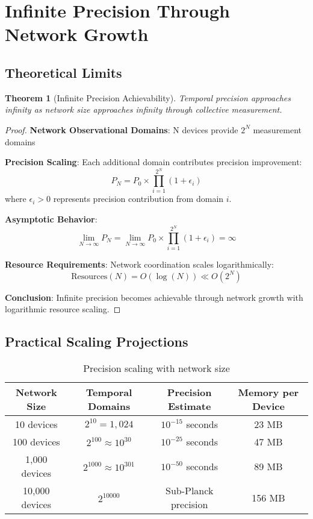 \documentclass[12pt,a4paper]{article}
\newtheorem{theorem}{Theorem}[section]
\begin{document}
\section{Infinite Precision Through Network Growth}

\subsection{Theoretical Limits}

\begin{theorem}[Infinite Precision Achievability]
Temporal precision approaches infinity as network size approaches infinity through collective measurement.
\end{theorem}

\begin{proof}
\textbf{Network Observational Domains}: N devices provide $2^N$ measurement domains

\textbf{Precision Scaling}: Each additional domain contributes precision improvement:
$$P_N = P_0 \times \prod_{i=1}^{2^N} (1 + \epsilon_i)$$
where $\epsilon_i > 0$ represents precision contribution from domain $i$.

\textbf{Asymptotic Behavior}:
$$\lim_{N \to \infty} P_N = \lim_{N \to \infty} P_0 \times \prod_{i=1}^{2^N} (1 + \epsilon_i) = \infty$$

\textbf{Resource Requirements}: Network coordination scales logarithmically:
$$\text{Resources}(N) = O(\log(N)) \ll O(2^N)$$

\textbf{Conclusion}: Infinite precision becomes achievable through network growth with logarithmic resource scaling.
\end{proof}

\subsection{Practical Scaling Projections}

\begin{table}[h]
\centering
\begin{tabular}{|c|c|c|c|}
\hline
\textbf{Network Size} & \textbf{Temporal Domains} & \textbf{Precision Estimate} & \textbf{Memory per Device} \\
\hline
10 devices & $2^{10} = 1,024$ & $10^{-15}$ seconds & 23 MB \\
100 devices & $2^{100} \approx 10^{30}$ & $10^{-25}$ seconds & 47 MB \\
1,000 devices & $2^{1000} \approx 10^{301}$ & $10^{-50}$ seconds & 89 MB \\
10,000 devices & $2^{10000}$ & Sub-Planck precision & 156 MB \\
\hline
\end{tabular}
\caption{Precision scaling with network size}
\end{table}
\end{document}

